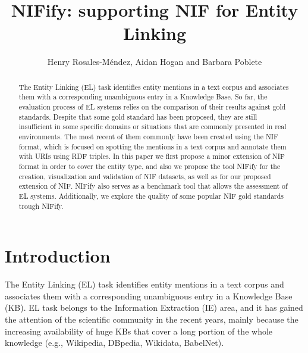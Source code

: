 \documentclass{llncs}
\begin{document}
\title{NIFify: supporting NIF for Entity Linking}
\author{Henry Rosales-M\'endez, Aidan Hogan and Barbara Poblete}

\newcommand{\ds}{\textsc{VoxEL}\xspace}

\maketitle  %
\begin{abstract}
The Entity Linking (EL) task identifies entity mentions in a text corpus and associates them with a corresponding unambiguous entry in a Knowledge Base. So far, the evaluation process of EL systems relies on the comparison of their results against gold standards. Despite that some gold standard has been proposed, they are still insufficient in some specific domains or situations that are commonly presented in real environments. 
The most recent of them commonly have been created using the NIF format, which is focused on spotting the mentions in a text corpus and annotate them with URIs using RDF triples. In this paper we first propose a minor extension of NIF format in order to cover the entity type, and also we propose the tool NIFify for the creation, visualization and validation of NIF datasets, as well as for our proposed extension of NIF. NIFify also serves as a benchmark tool that allows the assessment of EL systems. Additionally, we explore the quality of some popular NIF gold standards trough NIFify. 
\\
\end{abstract}



\section{Introduction} 
\label{sec:intro}

The Entity Linking (EL) task identifies entity mentions in a text corpus and associates them with a corresponding unambiguous entry in a Knowledge Base (KB). EL task belongs to the Information Extraction (IE) area, and it has gained the attention of the scientific community in the recent years, mainly because the increasing availability of huge KBs that cover a long portion of the whole knowledge (e.g., Wikipedia, DBpedia, Wikidata, BabelNet).
\end{document}
